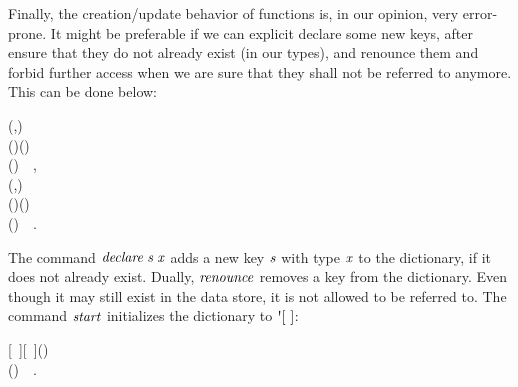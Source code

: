 Finally, the creation/update behavior of \Redis{} functions is, in our opinion,
very error-prone. It might be preferable if we can explicit declare some new
keys, after ensure that they do not already exist (in our types), and renounce
them and forbid further access when we are sure that they shall not be referred
to anymore. This can be done below:
\begin{hscode}\SaveRestoreHook
{}%
%
%
\>[B]{}\mathbin{::}(\;,\;\;\mathord{\sim}){}\<[E]%
\\
\>[B]{}\<[9]%
\>[9]{}\Rightarrow {}\;\to {}\;\to {}\;\;(\;\;\;)\;(){}\<[E]%
\\
\>[B]{}\;\;\mathrel{=}\mathbin{\$}\;()~~,{}\<[E]%
\\[\blanklineskip]%
\>[B]{}\mathbin{::}(\;,\;\;\mathord{\sim}){}\<[E]%
\\
\>[B]{}\<[9]%
\>[9]{}\Rightarrow {}\;\to {}\;\;(\;\;)\;(){}\<[E]%
\\
\>[B]{}\;\mathrel{=}\mathbin{\$}\;()~~.{}\<[E]%
\ColumnHook
\end{hscode}\resethooks
The command \ensuremath{\Varid{declare}\;\Varid{s}\;\Varid{x}} adds a new key \ensuremath{\Varid{s}} with type \ensuremath{\Varid{x}} to the dictionary,
if it does not already exist. Dually, \ensuremath{\Varid{renounce}} removes a key from the
dictionary. Even though it may still exist in the data store, it is not allowed
to be referred to. The command \ensuremath{\Varid{start}} initializes the dictionary to \ensuremath{\mbox{\textquotesingle}[~]}:
\begin{hscode}\SaveRestoreHook
{}%
%
\>[B]{}\mathbin{::}\;\mbox{\textquotesingle}[~]\;\mbox{\textquotesingle}[~]\;(){}\<[E]%
\\
\>[B]{}\mathrel{=}\mathbin{\$}\;()~~.{}\<[E]%
\ColumnHook
\end{hscode}\resethooks

